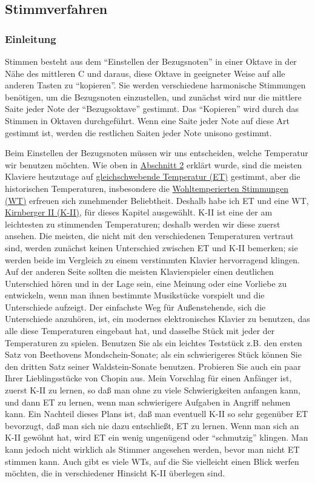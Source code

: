 
\subsection{Stimmverfahren}
\label{c2_6}

\subsubsection{Einleitung}
\label{c2_6a}

Stimmen besteht aus dem \enquote{Einstellen der Bezugsnoten} in einer Oktave in der Nähe des mittleren C und daraus, diese Oktave in geeigneter Weise auf alle anderen Tasten zu \enquote{kopieren}.
Sie werden verschiedene harmonische Stimmungen benötigen, um die Bezugsnoten einzustellen, und zunächst wird nur die mittlere Saite jeder Note der \enquote{Bezugsoktave} gestimmt.
Das \enquote{Kopieren} wird durch das Stimmen in Oktaven durchgeführt.
Wenn eine Saite jeder Note auf diese Art gestimmt ist, werden die restlichen Saiten jeder Note unisono gestimmt.

Beim Einstellen der Bezugsnoten müssen wir uns entscheiden, welche Temperatur wir benutzen möchten.
Wie oben in \hyperref[c2_2]{Abschnitt 2} erklärt wurde, sind die meisten Klaviere heutzutage auf \hyperref[et1]{gleichschwebende Temperatur (ET)} gestimmt, aber die historischen Temperaturen, insbesondere die \hyperref[c2_2_wtk2]{Wohltemperierten Stimmungen (WT)} erfreuen sich zunehmender Beliebtheit.
Deshalb habe ich ET und eine WT, \hyperref[c2_6_kirn]{Kirnberger II (K-II)}, für dieses Kapitel ausgewählt.
K-II ist eine der am leichtesten zu stimmenden Temperaturen; deshalb werden wir diese zuerst ansehen.
Die meisten, die nicht mit den verschiedenen Temperaturen vertraut sind, werden zunächst keinen Unterschied zwischen ET und K-II bemerken; sie werden beide im Vergleich zu einem verstimmten Klavier hervorragend klingen.
Auf der anderen Seite sollten die meisten Klavierspieler einen deutlichen Unterschied hören und in der Lage sein, eine Meinung oder eine Vorliebe zu entwickeln, wenn man ihnen bestimmte Musikstücke vorspielt und die Unterschiede aufzeigt.
Der einfachste Weg für Außenstehende, sich die Unterschiede anzuhören, ist, ein modernes elektronisches Klavier zu benutzen, das alle diese Temperaturen eingebaut hat, und dasselbe Stück mit jeder der Temperaturen zu spielen.
Benutzen Sie als ein leichtes Teststück z.B. den ersten Satz von Beethovens Mondschein-Sonate; als ein schwierigeres Stück können Sie den dritten Satz seiner Waldstein-Sonate benutzen.
Probieren Sie auch ein paar Ihrer Lieblingsstücke von Chopin aus.
Mein Vorschlag für einen Anfänger ist, zuerst K-II zu lernen, so daß man ohne zu viele Schwierigkeiten anfangen kann, und dann ET zu lernen, wenn man schwierigere Aufgaben in Angriff nehmen kann.
Ein Nachteil dieses Plans ist, daß man eventuell K-II so sehr gegenüber ET bevorzugt, daß man sich nie dazu entschließt, ET zu lernen.
Wenn man sich an K-II gewöhnt hat, wird ET ein wenig ungenügend oder \enquote{schmutzig} klingen.
Man kann jedoch nicht wirklich als Stimmer angesehen werden, bevor man nicht ET stimmen kann.
Auch gibt es viele WTs, auf die Sie vielleicht einen Blick werfen möchten, die in verschiedener Hinsicht K-II überlegen sind.

